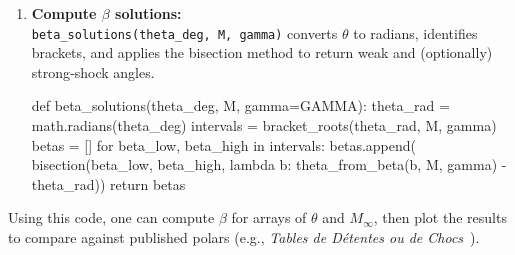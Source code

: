 \begin{enumerate}[label=-, leftmargin=*, itemsep=1em]
    \item \textbf{Compute \(\beta\) solutions:}\\
    \texttt{beta\_solutions(theta\_deg, M, gamma)} converts \(\theta\) to radians,
    identifies brackets, and applies the bisection method to return
    weak and (optionally) strong‐shock angles.
    \begin{pycode}
def beta_solutions(theta_deg, M, gamma=GAMMA):
    theta_rad = math.radians(theta_deg)
    intervals = bracket_roots(theta_rad, M, gamma)
    betas = []
    for beta_low, beta_high in intervals:
        betas.append(
            bisection(beta_low, beta_high,
                      lambda b: theta_from_beta(b, M, gamma) - theta_rad))
    return betas
    \end{pycode}
\end{enumerate}

Using this code, one can compute \(\beta\) for arrays of \(\theta\) and \(M_\infty\), then plot the results to compare against published polars (e.g., \emph{Tables de Détentes ou de Chocs}~\cite{Supaero}).

